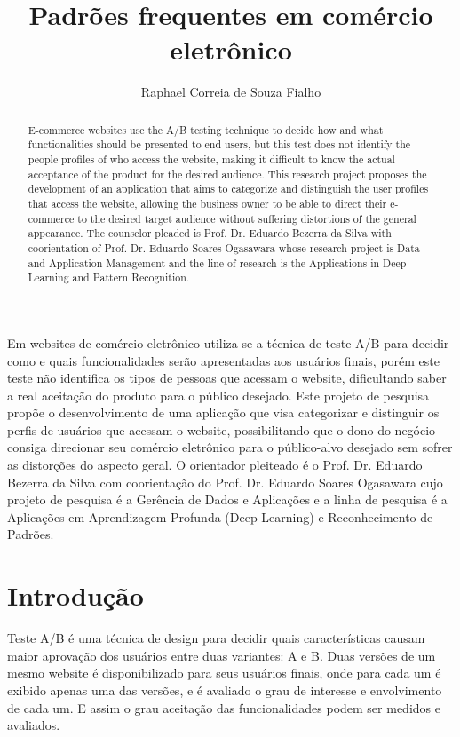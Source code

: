 \documentclass[12pt]{article}
\title{Padrões frequentes em comércio eletrônico}
\author{Raphael Correia de Souza Fialho\inst{1}}
\begin{document}
 

\maketitle

\begin{abstract}
   E-commerce websites use the A/B testing technique to decide how and what functionalities should be presented to end users, but this test does not identify the people profiles of who access the website, making it difficult to know the actual acceptance of the product for the desired audience.
   This research project proposes the development of an application that aims to categorize and distinguish the user profiles that access the website, allowing the business owner to be able to direct their e-commerce to the desired target audience without suffering distortions of the general appearance. The counselor pleaded is Prof. Dr. Eduardo Bezerra da Silva with coorientation of Prof. Dr. Eduardo Soares Ogasawara whose research project is Data and Application Management and the line of research is the Applications in Deep Learning and Pattern Recognition.
\end{abstract}
     
\begin{resumo} 
  Em websites de comércio eletrônico utiliza-se a técnica de teste A/B para decidir como e quais funcionalidades serão apresentadas aos usuários finais, porém este teste não identifica os tipos de pessoas que acessam o website, dificultando saber a real aceitação do produto para o público desejado.
  Este projeto de pesquisa propõe o desenvolvimento de uma aplicação que visa categorizar e distinguir os perfis de usuários que acessam o website, possibilitando que o dono do negócio consiga direcionar seu comércio eletrônico para o público-alvo desejado sem sofrer as distorções do aspecto geral. O orientador pleiteado é o Prof. Dr. Eduardo Bezerra da Silva com coorientação do Prof. Dr. Eduardo Soares Ogasawara cujo projeto de pesquisa é a Gerência de Dados e Aplicações e a linha de pesquisa é a Aplicações em Aprendizagem Profunda (Deep Learning) e Reconhecimento de Padrões.
\end{resumo}


\section{Introdução}

Teste A/B é uma técnica de design para decidir quais características causam maior aprovação dos usuários entre duas variantes: A e B. Duas versões de um mesmo website é disponibilizado para seus usuários finais, onde para cada um é exibido apenas uma das versões, e é avaliado o grau de interesse e envolvimento de cada um. E assim o grau aceitação das funcionalidades podem ser medidos e avaliados.
\end{document}
